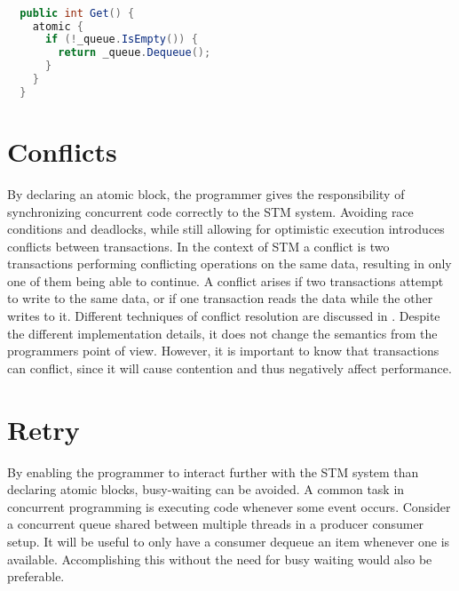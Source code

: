 \begin{lstlisting}[label=lst:stm_atomic_block,
  caption={Threadsafe queue},
  language=Java,  
  showspaces=false,
  showtabs=false,
  breaklines=true,
  showstringspaces=false,
  breakatwhitespace=true,
  commentstyle=\color{greencomments},
  keywordstyle=\color{bluekeywords},
  stringstyle=\color{redstrings},
  morekeywords={atomic, retry, orElse}]  % Start your code-block

  public int Get() { 
    atomic {
      if (!_queue.IsEmpty()) {
        return _queue.Dequeue();
      }
    }
  }
\end{lstlisting}

\section{Conflicts}
By declaring an atomic block, the programmer gives the responsibility of synchronizing concurrent code correctly to the \ac{STM} system. Avoiding race conditions and deadlocks, while still allowing for optimistic execution introduces conflicts between transactions. In the context of \ac{STM} a conflict is two transactions performing conflicting operations on the same data, resulting in only one of them being able to continue\cite[p. 20]{harris2010transactional}. A conflict arises if two transactions attempt to write to the same data, or if one transaction reads the data while the other writes to it. Different techniques of conflict resolution are discussed in \cite[p. 45-46 \& 52-55]{dpt907e14trending}. Despite the different implementation details, it does not change the semantics from the programmers point of view. However, it is important to know that transactions can conflict, since it will cause contention and thus negatively affect performance.

\section{Retry}
By enabling the programmer to interact further with the \ac{STM} system than declaring atomic blocks, busy-waiting can be avoided. A common task in concurrent programming is executing code whenever some event occurs. Consider a concurrent queue shared between multiple threads in a producer consumer setup. It will be useful to only have a consumer dequeue an item whenever one is available. Accomplishing this without the need for busy waiting would also be preferable.

